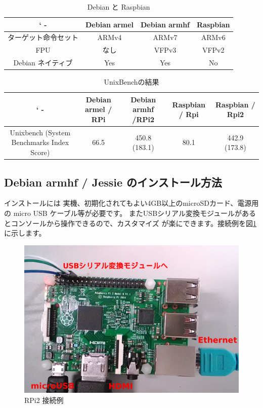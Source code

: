 \documentclass[mingoth,a4paper]{jsarticle}
\begin{document}
\begin{table}
\caption{Debian と Raspbian}
\begin{center}
\begin{tabular}{|c|c|c|c|}
\hline`
 - & Debian armel & Debian armhf & Raspbian \\
\hline
ターゲット命令セット &  ARMv4 & ARMv7 & ARMv6 \\
FPU &  なし &  VFPv3  &  VFPv2 \\
Debian ネイティブ & Yes & Yes & No \\
\hline
\end{tabular}
\end{center}
\label{fig:rpi-sw}
\end{table}

\begin{table}
\caption{UnixBenchの結果}
\begin{center}
\begin{tabular}{|c|c|c|c|c|}
\hline`
 - & Debian armel / RPi & Debian armhf /RPi2 & Raspbian / Rpi & Raspbian / Rpi2 \\
\hline
Unixbench (System Benchmarks Index Score) & 66.5 & 450.8 (183.1) & 80.1 & 442.9 (173.8)\\
\hline
\end{tabular}
\end{center}
\label{fig:rpi-sw}
\end{table}


\subsection{Debian armhf / Jessie のインストール方法}

インストールには 実機、初期化されてもよい4GB以上のmicroSDカード、電源用の
micro USB ケーブル等が必要です。
またUSBシリアル変換モジュールがあるとコンソールから操作できるので、カスタマイズ
が楽にできます。接続例を図\ref{fig:rpi2-hw-setting}に示します。

\begin{figure}[htbp]
\begin{center}
\includegraphics[width=0.7\hsize]{image201503/rpi2-hw-setting.png}
\end{center}
\caption{RPi2 接続例}
\label{fig:rpi2-hw-setting}
\end{figure}
\end{document}

